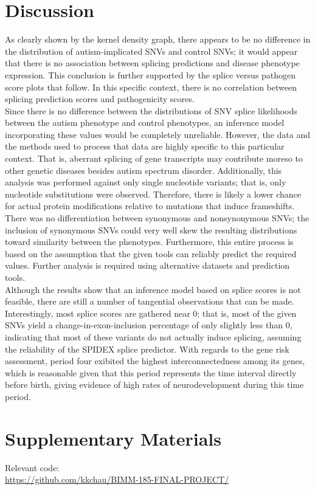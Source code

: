 \documentclass[12pt]{article}
\begin{document}
\section{Discussion}
As clearly shown by the kernel density graph, there appears to be no difference
in the distribution of autism-implicated SNVs and control SNVs; it would appear
that there is no association between splicing predictions and disease phenotype
expression. This conclusion is further supported by the splice versus 
pathogen score plots that follow. In this specific context, there is no 
correlation between splicing prediction scores and pathogenicity scores.
\\[\baselineskip]
Since there is no difference between the distributions of SNV splice 
likelihoods between the autism phenotype and control phenotypes, an inference
model incorporating these values would be completely unreliable. However,
the data and the methods used to process that data are highly specific to this 
particular context. That is, aberrant splicing of gene transcripts may 
contribute moreso to other genetic diseases besides autism spectrum disorder. 
Additionally, this analysis was performed against only single nucleotide 
variants; that is, only nucleotide substitutions were observed. Therefore,
there is likely a lower chance for actual protein modifications relative to
mutations that induce frameshifts. There was no differentiation between 
synonymous and nonsynonymous SNVs; the inclusion of synonymous SNVs could very
well skew the resulting distributions toward similarity between the phenotypes.
Furthermore, this entire process is based on the assumption that the given 
tools can reliably predict the required values. Further analysis is required
using alternative datasets and prediction tools.
\\[\baselineskip]
Although the results show that an inference model based on splice scores is not
feasible, there are still a number of tangential observations that can be made.
Interestingly, most splice scores are gathered near 0; that is, most of the 
given SNVs yield a change-in-exon-inclusion percentage of only slightly less
than 0, indicating that most of these variants do not actually induce splicing,
assuming the reliability of the SPIDEX splice predictor. With regards to the 
gene risk assessment, period four exibited the highest interconnectedness 
among its genes, which is reasonable given that this period represents the 
time interval directly before birth, giving evidence of high rates of 
neurodevelopment during this time period.

\section{Supplementary Materials}
Relevant code:\\
\href{https://github.com/kkchau/BIMM-185-FINAL-PROJECT/}{https://github.com/kkchau/BIMM-185-FINAL-PROJECT/}
\end{document}
